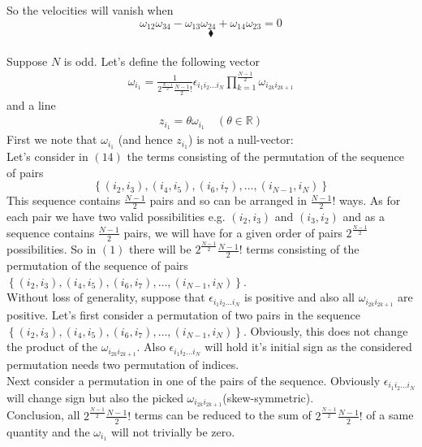 So the velocities will vanish when$$\omega_{12}\omega_{34}-\omega_{13}\omega_{24}+\omega_{14}\omega_{23}=0$$
$$\blacklozenge$$\\
Suppose $N$ is odd. Let's define the following vector
\begin{align}
\omega_{i_1}= \frac{1}{2^{\frac{N-1}{2}}\frac{N-1}{2}!}\epsilon_{i_{1} i_{2} \dots i_{N}}\prod_{k=1}^{\frac{N-1}{2}}\omega_{i_{2k} i_{2k+1}}
\end{align}
and a line
\begin{align}
z_{i_1} = \theta \omega_{i_1}\quad (\theta \in \mathbb{R})
\end{align}
First we note that $\omega_{i_1}$ (and hence $z_{i_1}$) is not a null-vector:\\
Let's consider in $(14)$ the terms consisting of the permutation of the sequence of pairs $$\left\{\left( i_2,i_3 \right),\left( i_4,i_5 \right),\left( i_6,i_7\right),\dots ,\left( i_{N-1},i_N \right)\right\}$$ This sequence contains $\frac{N-1}{2}$ pairs and so can be arranged in $\frac{N-1}{2}!$ ways. As for each pair we have two valid possibilities e.g. $\left( i_2,i_3 \right)$ and $\left( i_3,i_2 \right)$ and as a sequence contains $\frac{N-1}{2}$ pairs, we will have for a given order of pairs $2^{\frac{N-1}{2}}$ possibilities. So in $(1)$ there will be $2^{\frac{N-1}{2}}\frac{N-1}{2}!$ terms consisting of the permutation of the sequence of pairs $\left\{\left( i_2,i_3 \right),\left( i_4,i_5 \right),\left( i_6,i_7\right),\dots ,\left( i_{N-1},i_N \right)\right\}$.\\
Without loss of generality, suppose that $\epsilon_{i_{1} i_{2} \dots i_{N}}$ is positive and also all $\omega_{i_{2k} i_{2k+1}}$ are positive.
Let's first consider a permutation of two pairs in the sequence $\left\{\left( i_2,i_3 \right),\left( i_4,i_5 \right),\left( i_6,i_7\right),\dots ,\left( i_{N-1},i_N \right)\right\}$. Obviously, this does not change the product of the $\omega_{i_{2k} i_{2k+1}}$. Also $\epsilon_{i_{1} i_{2} \dots i_{N}}$ will hold it's initial sign as the considered permutation needs two permutation of indices.\\
Next consider a permutation in one of the pairs of the sequence. Obviously $\epsilon_{i_{1} i_{2} \dots i_{N}}$ will change sign but also the picked $\omega_{i_{2k} i_{2k+1}}$(skew-symmetric). \\
Conclusion, all $2^{\frac{N-1}{2}}\frac{N-1}{2}!$ terms can be reduced to the sum of $2^{\frac{N-1}{2}}\frac{N-1}{2}!$ of a same quantity and the  $\omega_{i_1}$ will not trivially be zero.\\
